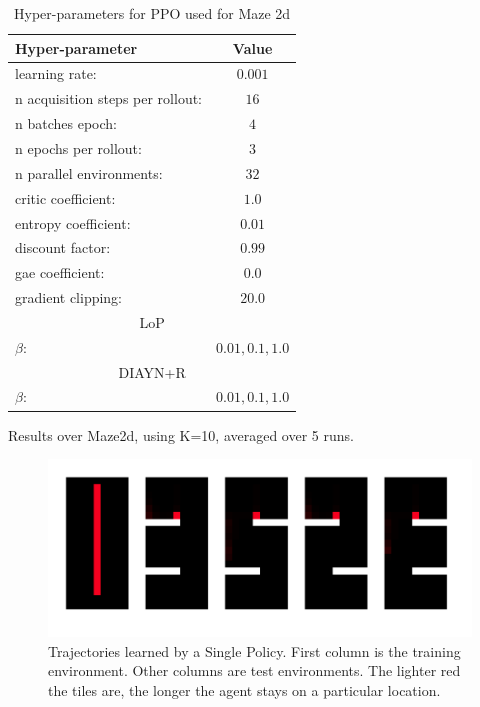 \begin{table}[h!]
\begin{center}
\begin{tabular}{l|c} \toprule
   \textbf{Hyper-parameter} & \textbf{Value} \\ \hline
    learning rate: &  $0.001$\\
    n acquisition steps per rollout: & $16$ \\
    n batches epoch: & $4$ \\
    n epochs per rollout: & $3$ \\
    n parallel environments: &  $32$\\
    critic coefficient: &  $1.0$\\
    entropy coefficient: &  $0.01$\\
    discount factor: &  $0.99$\\
    gae coefficient: &  $0.0$\\
    gradient clipping: & $20.0$ \\ 
    \multicolumn{2}{c}{LoP} \\ \hline
    $\beta$: & $0.01,0.1,1.0$ \\ \toprule
    \multicolumn{2}{c}{DIAYN+R} \\ \hline
    $\beta$: & $0.01,0.1,1.0$ \\ \hline
\end{tabular}
\end{center}
\caption{Hyper-parameters for PPO used for Maze 2d}
\label{table:hp_maze}
\end{table}

\begin{table}[h!]
\centering

\caption{Results over Maze2d, using K=10, averaged over 5 runs. }
\label{table:maze2d_results}
\end{table}

\begin{figure}[h!]
    \centering
    \includegraphics[width=0.5\linewidth]{images/SINGLEPOLICY.png}
    \caption{Trajectories learned by a Single Policy. First column is the training environment. Other columns are test environments. The lighter red the tiles are, the longer the agent stays on a particular location.}
    \label{fig:maze1}
\end{figure}

